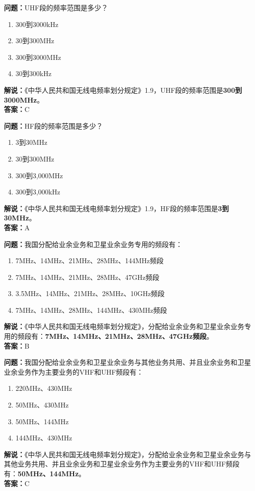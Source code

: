 \bigskip


\noindent\textbf{问题：}UHF段的频率范围是多少？
\begin{enumerate}[label=\Alph*), leftmargin=3em]
	\item 300到3000kHz
	\item 30到300MHz
	\item 300到3000MHz
	\item 30到300kHz
\end{enumerate}
\noindent\textbf{解说：}《中华人民共和国无线电频率划分规定》1.9，UHF段的频率范围是\textbf{300到3000MHz}。\\\noindent\textbf{答案：}C


\bigskip


\noindent\textbf{问题：}HF段的频率范围是多少？
\begin{enumerate}[label=\Alph*), leftmargin=3em]
	\item 3到30MHz
	\item 30到300MHz
	\item 300到3,000MHz
	\item 300到3,000kHz
\end{enumerate}
\noindent\textbf{解说：}《中华人民共和国无线电频率划分规定》1.9，HF段的频率范围是\textbf{3到30MHz}。\\\noindent\textbf{答案：}A


\bigskip


\noindent\textbf{问题：}我国分配给业余业务和卫星业余业务专用的频段有：
\begin{enumerate}[label=\Alph*), leftmargin=3em]
  \item 7MHz、14MHz、21MHz、28MHz、144MHz频段
  \item 7MHz、14MHz、21MHz、28MHz、47GHz频段
  \item 3.5MHz、14MHz、21MHz、28MHz、10GHz频段
  \item 7MHz、14MHz、28MHz、144MHz、430MHz频段
\end{enumerate}
\noindent\textbf{解说：}《中华人民共和国无线电频率划分规定》，分配给业余业务和卫星业余业务专用的频段有：\textbf{7MHz、14MHz、21MHz、28MHz、47GHz频段}。\\\noindent\textbf{答案：}B


\bigskip


\noindent\textbf{问题：}我国分配给业余业务和卫星业余业务与其他业务共用、并且业余业务和卫星业余业务作为主要业务的VHF和UHF频段有：
\begin{enumerate}[label=\Alph*), leftmargin=3em]
  \item 220MHz、430MHz
  \item 50MHz、430MHz
  \item 50MHz、144MHz
  \item 144MHz、430MHz
\end{enumerate}
\noindent\textbf{解说：}《中华人民共和国无线电频率划分规定》，分配给业余业务和卫星业余业务与其他业务共用、并且业余业务和卫星业余业务作为主要业务的VHF和UHF频段有：\textbf{50MHz、144MHz}。\\\noindent\textbf{答案：}C


